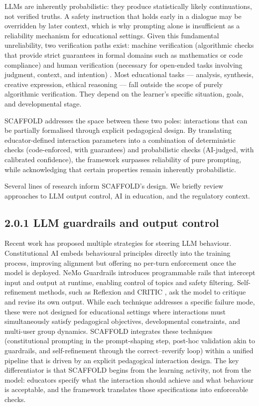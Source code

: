 \documentclass[fleqn,10pt]{wlscirep}
\begin{document}
LLMs are inherently probabilistic: they produce statistically likely continuations, not verified truths. A safety instruction that holds early in a dialogue may be overridden by later context, which is why prompting alone is insufficient as a reliability mechanism for educational settings. Given this fundamental unreliability, two verification paths exist: machine verification (algorithmic checks that provide strict guarantees in formal domains such as mathematics or code compliance) \cite{Gou2024, Madaan2023} and human verification (necessary for open-ended tasks involving judgment, context, and intention) \cite{Korthals2026}. Most educational tasks --- analysis, synthesis, creative expression, ethical reasoning --- fall outside the scope of purely algorithmic verification. They depend on the learner's specific situation, goals, and developmental stage.

SCAFFOLD addresses the space between these two poles: interactions that can be partially formalised through explicit pedagogical design. By translating educator-defined interaction parameters into a combination of deterministic checks (code-enforced, with guarantees) and probabilistic checks (AI-judged, with calibrated confidence), the framework surpasses reliability of pure prompting, while acknowledging that certain properties remain inherently probabilistic.

Several lines of research inform SCAFFOLD's design. We briefly review approaches to LLM output control, AI in education, and the regulatory context.

\subsection*{2.0.1 LLM guardrails and output control}

Recent work has proposed multiple strategies for steering LLM behaviour. Constitutional AI \cite{Bai2022} embeds behavioural principles directly into the training process, improving alignment but offering no per-turn enforcement once the model is deployed. NeMo Guardrails \cite{Rebedea2023} introduces programmable rails that intercept input and output at runtime, enabling control of topics and safety filtering. Self-refinement methods, such as Reflexion \cite{Shinn2023} and CRITIC \cite{Gou2024}, ask the model to critique and revise its own output. While each technique addresses a specific failure mode, these were not designed for educational settings where interactions must simultaneously satisfy pedagogical objectives, developmental constraints, and multi-user group dynamics. SCAFFOLD integrates these techniques (constitutional prompting in the prompt-shaping step, post-hoc validation akin to guardrails, and self-refinement through the correct--reverify loop) within a unified pipeline that is driven by an explicit pedagogical interaction design. The key differentiator is that SCAFFOLD begins from the learning activity, not from the model: educators specify what the interaction should achieve and what behaviour is acceptable, and the framework translates those specifications into enforceable checks.
\end{document}
